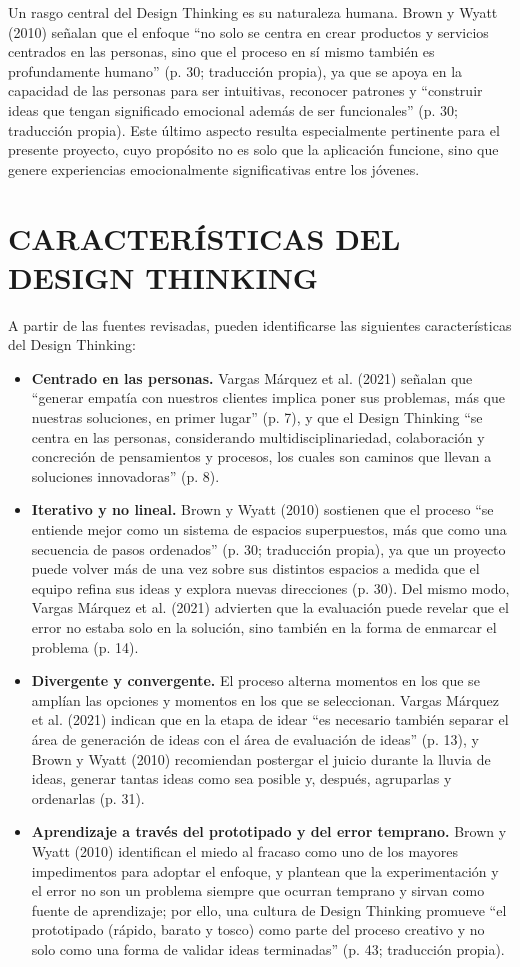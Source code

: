 Un rasgo central del Design Thinking es su naturaleza humana. Brown y Wyatt (2010) señalan que el enfoque ``no solo se centra en crear productos y servicios centrados en las personas, sino que el proceso en sí mismo también es profundamente humano'' (p. 30; traducción propia), ya que se apoya en la capacidad de las personas para ser intuitivas, reconocer patrones y ``construir ideas que tengan significado emocional además de ser funcionales'' (p. 30; traducción propia). Este último aspecto resulta especialmente pertinente para el presente proyecto, cuyo propósito no es solo que la aplicación funcione, sino que genere experiencias emocionalmente significativas entre los jóvenes.

\section{CARACTERÍSTICAS DEL DESIGN THINKING}
A partir de las fuentes revisadas, pueden identificarse las siguientes características del Design Thinking:

\begin{itemize}
    \item \textbf{Centrado en las personas.} Vargas Márquez et al. (2021) señalan que ``generar empatía con nuestros clientes implica poner sus problemas, más que nuestras soluciones, en primer lugar'' (p. 7), y que el Design Thinking ``se centra en las personas, considerando multidisciplinariedad, colaboración y concreción de pensamientos y procesos, los cuales son caminos que llevan a soluciones innovadoras'' (p. 8).
    \item \textbf{Iterativo y no lineal.} Brown y Wyatt (2010) sostienen que el proceso ``se entiende mejor como un sistema de espacios superpuestos, más que como una secuencia de pasos ordenados'' (p. 30; traducción propia), ya que un proyecto puede volver más de una vez sobre sus distintos espacios a medida que el equipo refina sus ideas y explora nuevas direcciones (p. 30). Del mismo modo, Vargas Márquez et al. (2021) advierten que la evaluación puede revelar que el error no estaba solo en la solución, sino también en la forma de enmarcar el problema (p. 14).
    \item \textbf{Divergente y convergente.} El proceso alterna momentos en los que se amplían las opciones y momentos en los que se seleccionan. Vargas Márquez et al. (2021) indican que en la etapa de idear ``es necesario también separar el área de generación de ideas con el área de evaluación de ideas'' (p. 13), y Brown y Wyatt (2010) recomiendan postergar el juicio durante la lluvia de ideas, generar tantas ideas como sea posible y, después, agruparlas y ordenarlas (p. 31).
    \item \textbf{Aprendizaje a través del prototipado y del error temprano.} Brown y Wyatt (2010) identifican el miedo al fracaso como uno de los mayores impedimentos para adoptar el enfoque, y plantean que la experimentación y el error no son un problema siempre que ocurran temprano y sirvan como fuente de aprendizaje; por ello, una cultura de Design Thinking promueve ``el prototipado (rápido, barato y tosco) como parte del proceso creativo y no solo como una forma de validar ideas terminadas'' (p. 43; traducción propia).
\end{itemize}

